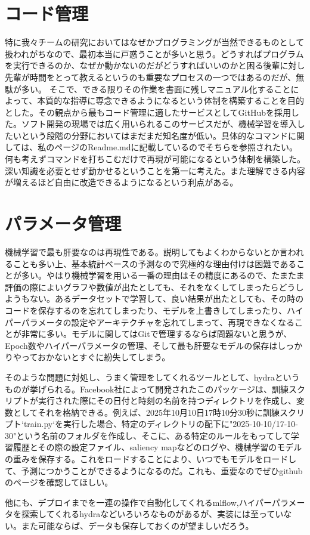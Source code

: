 \documentclass[uplatex]{suribt}
\begin{document}
\section{コード管理}
特に我々チームの研究においてはなぜかプログラミングが当然できるものとして扱われがちなので、最初本当に戸惑うことが多いと思う。どうすればプログラムを実行できるのか、なぜか動かないのだがどうすればいいのかと困る後輩に対し先輩が時間をとって教えるというのも重要なプロセスの一つではあるのだが、無駄が多い。  
そこで、できる限りその作業を書面に残しマニュアル化することによって、本質的な指導に専念できるようになるという体制を構築することを目的とした。その観点から最もコード管理に適したサービスとしてGitHubを採用した。ソフト開発の現場では広く用いられるこのサービスだが、機械学習を導入したいという段階の分野においてはまだまだ知名度が低い。具体的なコマンドに関しては、私のページのReadme.mdに記載しているのでそちらを参照されたい。何も考えずコマンドを打ちこむだけで再現が可能になるという体制を構築した。深い知識を必要とせず動かせるということを第一に考えた。また理解できる内容が増えるほど自由に改造できるようになるという利点がある。
\section{パラメータ管理}
機械学習で最も肝要なのは再現性である。説明してもよくわからないとか言われることも多い上、基本統計ベースの予測なので究極的な理由付けは困難であることが多い。やはり機械学習を用いる一番の理由はその精度にあるので、たまたま評価の際によいグラフや数値が出たとしても、それをなくしてしまったらどうしようもない。あるデータセットで学習して、良い結果が出たとしても、その時のコードを保存するのを忘れてしまったり、モデルを上書きしてしまったり、ハイパーパラメータの設定やアーキテクチャを忘れてしまって、再現できなくなることが非常に多い。モデルに関してはGitで管理するならば問題ないと思うが、Epoch数やハイパーパラメータの管理、そして最も肝要なモデルの保存はしっかりやっておかないとすぐに紛失してしまう。\par
そのような問題に対処し、うまく管理をしてくれるツールとして、hydraというものが挙げられる。Facebook社によって開発されたこのパッケージは、訓練スクリプトが実行された際にその日付と時刻の名前を持つディレクトリを作成し、変数としてそれを格納できる。例えば、2025年10月10日17時10分30秒に訓練スクリプト`train.py`を実行した場合、特定のディレクトリの配下に"2025-10-10/17-10-30"という名前のフォルダを作成し、そこに、ある特定のルールをもってして学習履歴とその際の設定ファイル、saliency mapなどのログや、機械学習のモデルの重みを保存する。これをロードすることにより、いつでもモデルをロードして、予測につかうことができるようになるのだ。これも、重要なのでぜひgithubのページを確認してほしい。\par
他にも、デプロイまでを一連の操作で自動化してくれるmlflow,ハイパーパラメータを探索してくれるhydraなどいろいろなものがあるが、実装には至っていない。また可能ならば、データも保存しておくのが望ましいだろう。
\end{document}
